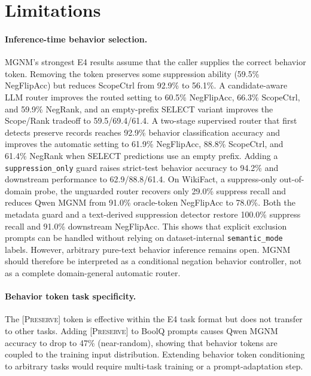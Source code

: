 \documentclass[letterpaper]{article}
\newcommand{\preserve}{[\textsc{Preserve}]}
\begin{document}
\section{Limitations}
\label{sec:limitations}

\paragraph{Inference-time behavior selection.}
MGNM's strongest E4 results assume that the caller supplies the correct
behavior token. Removing the token preserves some suppression ability
(59.5\% NegFlipAcc) but reduces ScopeCtrl from 92.9\% to 56.1\%.
A candidate-aware LLM router improves the routed setting to 60.5\% NegFlipAcc,
66.3\% ScopeCtrl, and 59.9\% NegRank, and an empty-prefix SELECT variant
improves the Scope/Rank tradeoff to 59.5/69.4/61.4.
A two-stage supervised router that first detects preserve records reaches
92.9\% behavior classification accuracy and improves the automatic setting to
61.9\% NegFlipAcc, 88.8\% ScopeCtrl, and 61.4\% NegRank when SELECT predictions
use an empty prefix. Adding a \texttt{suppression\_only} guard raises strict-test
behavior accuracy to 94.2\% and downstream performance to 62.9/88.8/61.4.
On WikiFact, a suppress-only out-of-domain probe, the unguarded router recovers
only 29.0\% suppress recall and reduces Qwen MGNM from 91.0\% oracle-token
NegFlipAcc to 78.0\%. Both the metadata guard and a text-derived suppression
detector restore 100.0\% suppress recall and 91.0\% downstream NegFlipAcc.
This shows that explicit exclusion prompts can be handled without relying on
dataset-internal \texttt{semantic\_mode} labels. However, arbitrary pure-text
behavior inference remains open. MGNM should therefore be interpreted as a
conditional negation behavior controller, not as a complete domain-general
automatic router.

\paragraph{Behavior token task specificity.}
The \preserve{} token is effective within the E4 task format but does not
transfer to other tasks.
Adding \preserve{} to BoolQ prompts causes Qwen MGNM accuracy to drop to 47\%
(near-random), showing that behavior tokens are coupled to the training input
distribution.
Extending behavior token conditioning to arbitrary tasks would require
multi-task training or a prompt-adaptation step.
\end{document}

